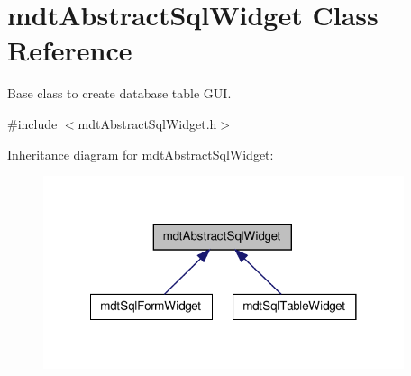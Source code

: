 \hypertarget{classmdt_abstract_sql_widget}{
\section{mdtAbstractSqlWidget Class Reference}
\label{classmdt_abstract_sql_widget}
}


Base class to create database table GUI.  




{\ttfamily \#include $<$mdtAbstractSqlWidget.h$>$}



Inheritance diagram for mdtAbstractSqlWidget:
\nopagebreak
\begin{figure}[H]
\begin{center}
\leavevmode
\includegraphics[width=300pt]{classmdt_abstract_sql_widget__inherit__graph}
\end{center}
\end{figure}
